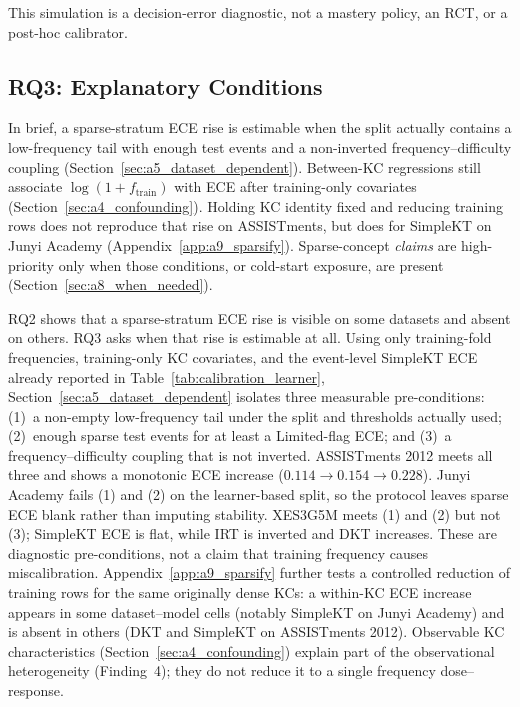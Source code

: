 This simulation is a decision-error diagnostic, not a mastery policy, an RCT, or a post-hoc calibrator.




\FloatBarrier

\subsection{RQ3: Explanatory Conditions}
\label{sec:rq3_explanatory}
In brief, a sparse-stratum ECE rise is estimable when the split actually contains a low-frequency tail with enough test events and a non-inverted frequency--difficulty coupling (Section~\ref{sec:a5_dataset_dependent}). Between-KC regressions still associate $\log(1+f_{\mathrm{train}})$ with ECE after training-only covariates (Section~\ref{sec:a4_confounding}). Holding KC identity fixed and reducing training rows does not reproduce that rise on ASSISTments, but does for SimpleKT on Junyi Academy (Appendix~\ref{app:a9_sparsify}). Sparse-concept \emph{claims} are high-priority only when those conditions, or cold-start exposure, are present (Section~\ref{sec:a8_when_needed}).

RQ2 shows that a sparse-stratum ECE rise is visible on some datasets and absent on others. RQ3 asks when that rise is estimable at all. Using only training-fold frequencies, training-only KC covariates, and the event-level SimpleKT ECE already reported in Table~\ref{tab:calibration_learner}, Section~\ref{sec:a5_dataset_dependent} isolates three measurable pre-conditions: (1)~a non-empty low-frequency tail under the split and thresholds actually used; (2)~enough sparse test events for at least a Limited-flag ECE; and (3)~a frequency--difficulty coupling that is not inverted. ASSISTments 2012 meets all three and shows a monotonic ECE increase ($0.114\to 0.154\to 0.228$). Junyi Academy fails (1) and (2) on the learner-based split, so the protocol leaves sparse ECE blank rather than imputing stability. XES3G5M meets (1) and (2) but not (3); SimpleKT ECE is flat, while IRT is inverted and DKT increases. These are diagnostic pre-conditions, not a claim that training frequency causes miscalibration. Appendix~\ref{app:a9_sparsify} further tests a controlled reduction of training rows for the same originally dense KCs: a within-KC ECE increase appears in some dataset--model cells (notably SimpleKT on Junyi Academy) and is absent in others (DKT and SimpleKT on ASSISTments 2012). Observable KC characteristics (Section~\ref{sec:a4_confounding}) explain part of the observational heterogeneity (Finding~4); they do not reduce it to a single frequency dose--response.

